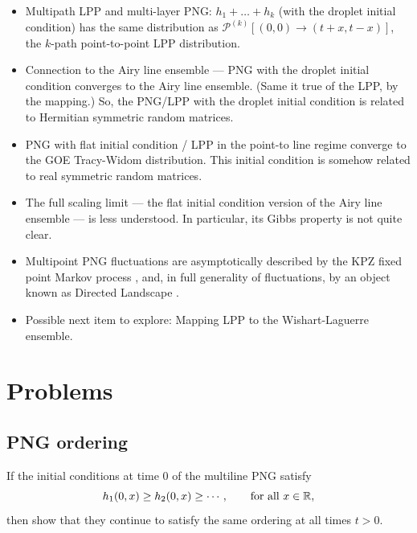 \documentclass[letterpaper,11pt,oneside,reqno]{book}
\numberwithin{equation}{chapter}  %
\theoremstyle{definition}
\begin{document}
\begin{itemize}
	\item Multipath LPP and multi-layer PNG: 
		$h_1+\ldots+h_k $ (with the droplet initial condition)
		has the same distribution as 
		$\mathcal{P}^{(k)}[(0,0)\to (t+x,t-x)]$, the $k$-path point-to-point LPP distribution.
	\item Connection to the Airy line ensemble --- PNG with
		the droplet initial condition converges to the Airy line
		ensemble. (Same it true of the LPP, by the mapping.)
		So, the PNG/LPP with the droplet initial condition 
		is related to Hermitian symmetric random matrices.
	\item PNG with flat initial condition / LPP in the point-to line regime 
		converge to the GOE Tracy-Widom distribution.
		This initial condition is somehow related to real symmetric random matrices.
	\item The full scaling limit --- the flat initial condition
		version of the Airy line ensemble --- is less understood. In particular, 
		its Gibbs property is not quite clear.
	\item Multipoint PNG fluctuations are asymptotically described by the 
		KPZ fixed point Markov process \cite{matetski2017kpz}, 
		and, in full generality of fluctuations,
		by an object known as Directed Landscape \cite{directed_landscape}.
	\item Possible next item to explore: 
		Mapping LPP to the Wishart-Laguerre ensemble.
\end{itemize}


























\section{Problems}


\subsection{PNG ordering}
\label{lecture12:prob:multiline-png}

If the initial conditions at time $0$ of the multiline PNG satisfy
\begin{equation*}
	h_1(0,x) \ge h_2(0,x) \ge \cdots ,\qquad \textnormal{for all } x\in\mathbb{R},
\end{equation*}
then show that they continue to satisfy the same ordering at all times $t>0$.
\end{document}

